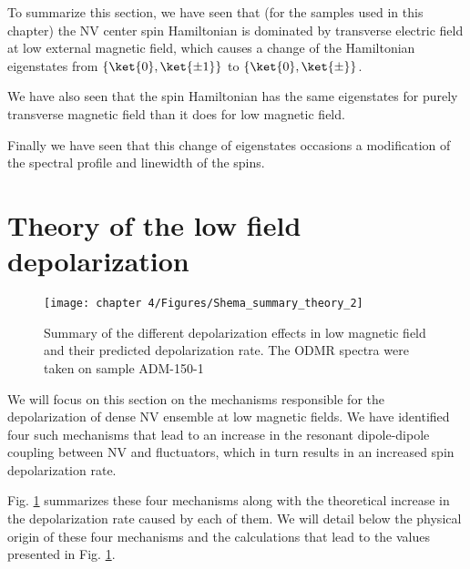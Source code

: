 \documentclass[a4paper, 11pt]{book}
\begin{document}
%
%
\bigskip

To summarize this section, we have seen that (for the samples used in this chapter) the NV center spin Hamiltonian is dominated by transverse electric field at low external magnetic field, which causes a change of the Hamiltonian eigenstates from $\{ \ket{0}, \ket{\pm 1} \}$ to $\{ \ket{0}, \ket{\pm} \}$. 

We have also seen that the spin Hamiltonian has the same eigenstates for purely transverse magnetic field than it does for low magnetic field. 

Finally we have seen that this change of eigenstates occasions a modification of the spectral profile and linewidth of the spins.

\section{Theory of the low field depolarization}
\label{sec causes zero field}
\begin{figure}[h]
\centering
\texttt{[image: chapter 4/Figures/Shema\_summary\_theory\_2]}
\caption{Summary of the different depolarization effects in low magnetic field and their predicted depolarization rate. The ODMR spectra were taken on sample ADM-150-1}
\label{summary_theory}
\end{figure}

We will focus on this section on the mechanisms responsible for the depolarization of dense NV ensemble at low magnetic fields. We have identified four such mechanisms that lead to an increase in the resonant dipole-dipole coupling between NV and fluctuators, which in turn results in an increased spin depolarization rate.

Fig. \ref{summary_theory} summarizes these four mechanisms along with the theoretical increase in the depolarization rate caused by each of them. We will detail below the physical origin of these four mechanisms and the calculations that lead to the values presented in Fig. \ref{summary_theory}.
\end{document}
